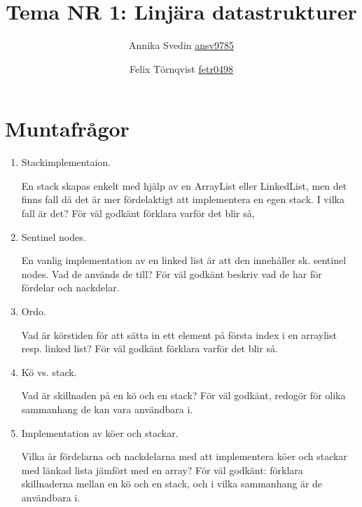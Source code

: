 \documentclass[a5paper,10pt,oneside]{article}
\title{Tema NR 1: Linjära datastrukturer}
\author{Annika Svedin \url{ansv9785} \and Felix Törnqvist \url{fetr0498}}
\begin{document}
\maketitle

\section*{Muntafrågor}

\begin{enumerate}

\item Stackimplementaion.

En stack skapas enkelt med hjälp av en ArrayList eller LinkedList, men det finns fall då det är mer fördelaktigt att implementera en egen stack. I vilka fall är det?
För väl godkänt förklara varför det blir så,

\item Sentinel nodes.

En vanlig implementation av en linked list är att den innehåller sk. sentinel nodes. Vad de används de till? 
För väl godkänt beskriv vad de har för fördelar och nackdelar.

\item Ordo.

Vad är körstiden för att sätta in ett element på första index i en arraylist resp. linked list? För väl godkänt förklara varför det blir så.

\item Kö vs. stack.

Vad är skillnaden på en kö och en stack? För väl godkänt, redogör för olika sammanhang de kan vara användbara i.

\item Implementation av köer och stackar.

Vilka är fördelarna och nackdelarna med att implementera köer och stackar med länkad lista jämfört med en array?
För väl godkänt: förklara skillnaderna mellan en kö och en stack, och i vilka sammanhang är de användbara i.


\end{enumerate}
\end{document}
